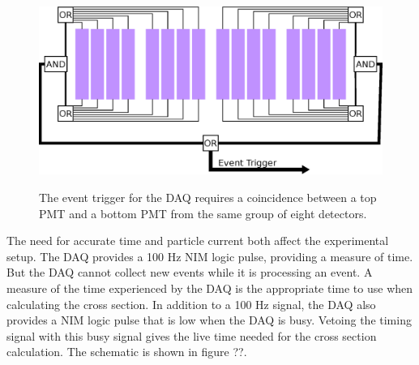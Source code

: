 \begin{figure}[htp]
\centering
\includegraphics[width=1.0\textwidth]{figures/event_trigger.eps}
\label{fig:eventTrig}
\caption{The event trigger for the DAQ requires a coincidence between a top PMT and a bottom PMT from the same group of eight detectors.}
\end{figure}

The need for accurate time and particle current both affect the experimental setup.  The DAQ provides a 100 Hz NIM logic pulse, providing a measure of time.  But the DAQ cannot collect new events while it is processing an event.  A measure of the time experienced by the DAQ is the appropriate time to use when calculating the cross section.  In addition to a 100 Hz signal, the DAQ also provides a NIM logic pulse that is low when the DAQ is busy.  Vetoing the timing signal with this busy signal gives the live time needed for the cross section calculation.  The schematic is shown in figure ??.



%
% 
% 
